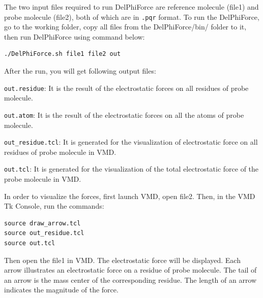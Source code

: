 \documentclass[9pt,tutorial]{livecoms}
\begin{document}
The two input files required to run DelPhiForce are reference molecule (file1) and probe molecule (file2), both of which are in \texttt{.pqr} format. To run the DelPhiForce, go to the working folder, copy all files from the DelPhiForce/bin/ folder to it, then run DelPhiForce using command below:

\begin{verbatim}
./DelPhiForce.sh file1 file2 out
\end{verbatim}

After the run, you will get following output files:

\texttt{out.residue}: It is the result of the electrostatic forces on all residues of probe molecule.

\texttt{out.atom}: It is the result of the electrostatic forces on all the atoms of probe molecule.

\texttt{out\_residue.tcl}: It is generated for the visualization of electrostatic force on all residues of probe molecule in VMD\cite{humphrey1996vmd}.

\texttt{out.tcl}: It is generated for the visualization of the total electrostatic force of the probe molecule in VMD\cite{humphrey1996vmd}.

In order to visualize the forces, first launch VMD, open file2. Then, in the VMD Tk Console, run the commands: 

\begin{verbatim}
source draw_arrow.tcl
source out_residue.tcl
source out.tcl
\end{verbatim}

Then open the file1 in VMD. The electrostatic force will be displayed.  Each arrow illustrates an electrostatic force on a residue of probe molecule. The tail of an arrow is the mass center of the corresponding residue. The length of an arrow indicates the magnitude of the force.
\end{document}

